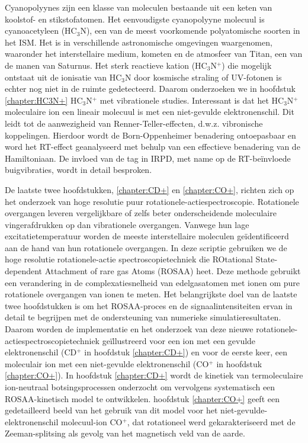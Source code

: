 {Cyanopolyynes zijn een klasse van moleculen bestaande uit een keten van koolstof- en stikstofatomen. Het eenvoudigste cyanopolyyne molecuul is cyanoacetyleen (HC$_3$N), een van de meest voorkomende polyatomische soorten in het ISM. Het is in verschillende astronomische omgevingen waargenomen, waaronder het interstellaire medium, kometen en de atmosfeer van Titan, een van de manen van Saturnus. Het sterk reactieve kation (HC$_3$N$^+$) die mogelijk ontstaat uit de ionisatie van HC$_3$N door kosmische straling of UV-fotonen is echter nog niet in de ruimte gedetecteerd. Daarom onderzoeken we in hoofdstuk \ref{chapter:HC3N+} HC$_3$N$^+$ met vibrationele studies. Interessant is dat het HC$_3$N$^+$ moleculaire ion een lineair molecuul is met een niet-gevulde elektronenschil. Dit leidt tot de aanwezigheid van Renner-Teller-effecten, d.w.z. vibronische koppelingen. Hierdoor wordt de Born-Oppenheimer benadering ontoepasbaar en word het RT-effect geanalyseerd met behulp van een effectieve benadering van de Hamiltoniaan. De invloed van de tag in IRPD, met name op de RT-be\"{i}nvloede buigvibraties, wordt in detail besproken.

De laatste twee hoofdstukken, \ref{chapter:CD+} en \ref{chapter:CO+}, richten zich op het onderzoek van hoge resolutie puur 
rotationele-actiespectroscopie. Rotationele overgangen leveren vergelijkbare of zelfs beter onderscheidende moleculaire 
vingerafdrukken op dan vibrationele overgangen. Vanwege hun lage excitatietemperatuur worden de meeste interstellaire 
moleculen geïdentificeerd aan de hand van hun rotationele overgangen. In deze scriptie gebruiken we de hoge resolutie 
rotationele-actie spectroscopietechniek die ROtational State-dependent Attachment of rare gas Atoms (ROSAA) heet. Deze 
methode gebruikt een verandering in de complexatiesnelheid van edelgasatomen met ionen om pure rotationele overgangen 
van ionen te meten. Het belangrijkste doel van de laatste twee hoofdstukken is om het ROSAA-proces en de 
signaalintensiteiten ervan in detail te begrijpen met de ondersteuning van numerieke simulatieresultaten. Daarom worden 
de implementatie en het onderzoek van deze nieuwe rotationele-actiespectroscopietechniek geïllustreerd voor een ion met 
een gevulde elektronenschil (CD$^+$ in hoofdstuk \ref{chapter:CD+}) en voor de eerste keer, een moleculair ion met een 
niet-gevulde elektronenschil (CO$^+$ in hoofdstuk \ref{chapter:CO+}). In hoofdstuk \ref{chapter:CD+} wordt de kinetiek 
van termoleculaire ion-neutraal botsingsprocessen onderzocht om vervolgens systematisch een ROSAA-kinetisch model te 
ontwikkelen. hoofdstuk \ref{chapter:CO+} geeft een gedetailleerd beeld van het gebruik van dit model voor het 
niet-gevulde-elektronenschil molecuul-ion CO$^+$, dat rotationeel werd gekarakteriseerd met de Zeeman-splitsing als 
gevolg van het magnetisch veld van de aarde.

}
